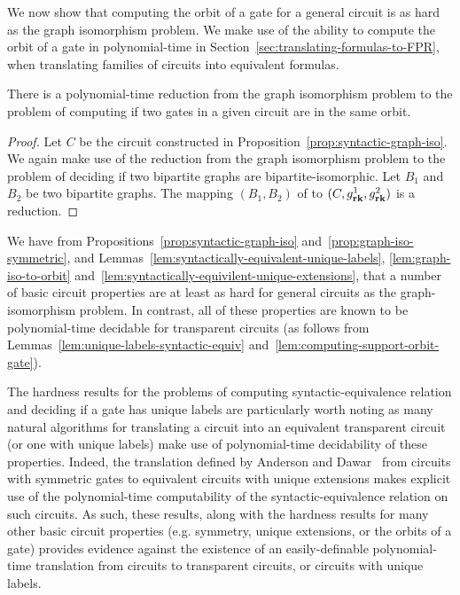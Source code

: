 \documentclass[../paper.tex]{subfiles}
\begin{document}
We now show that computing the orbit of a gate for a general circuit is as hard
as the graph isomorphism problem. We make use of the ability to compute the
orbit of a gate in polynomial-time in
Section~\ref{sec:translating-formulas-to-FPR}, when translating families of
circuits into equivalent formulas.

\begin{lem}
  There is a polynomial-time reduction from the graph isomorphism problem to the
  problem of computing if two gates in a given circuit are in the same orbit.
  \label{lem:graph-iso-to-orbit}
\end{lem}
\begin{proof}
  Let $C$ be the circuit constructed in
  Proposition~\ref{prop:syntactic-graph-iso}. We again make use of the reduction
  from the graph isomorphism problem to the problem of deciding if two bipartite
  graphs are bipartite-isomorphic. Let $B_1$ and $B_2$ be two bipartite graphs.
  The mapping $(B_1, B_2)$ of to $(C, g^1_{\text{\textbf{rk}}}, g^2_{\text{\textbf{rk}}})$ is a reduction.
\end{proof}

We have from Propositions~\ref{prop:syntactic-graph-iso}
and~\ref{prop:graph-iso-symmetric}, and
Lemmas~\ref{lem:syntactically-equivalent-unique-labels},
\ref{lem:graph-iso-to-orbit}
and~\ref{lem:syntactically-equivilent-unique-extensions}, that a number of basic
circuit properties are at least as hard for general circuits as the
graph-isomorphism problem. In contrast, all of these properties are known to be
polynomial-time decidable for transparent circuits (as follows from
Lemmas~\ref{lem:unique-labels-syntactic-equiv}
and~\ref{lem:computing-support-orbit-gate}).

The hardness results for the problems of computing syntactic-equivalence
relation and deciding if a gate has unique labels are particularly worth noting
as many natural algorithms for translating a circuit into an equivalent
transparent circuit (or one with unique labels) make use of polynomial-time
decidability of these properties. Indeed, the translation defined by Anderson
and Dawar~\cite{AndersonD17} from circuits with symmetric gates to equivalent
circuits with unique extensions makes explicit use of the polynomial-time
computability of the syntactic-equivalence relation on such circuits. As such,
these results, along with the hardness results for many other basic circuit
properties (e.g. symmetry, unique extensions, or the orbits of a gate) provides
evidence against the existence of an easily-definable polynomial-time
translation from circuits to transparent circuits, or circuits with unique
labels.
\end{document}
